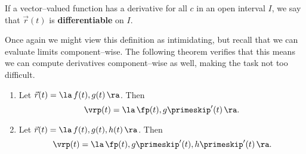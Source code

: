 
If a vector--valued function  has a derivative for all $c$ in an open interval $I$, we say that $\vec r(t)$ is \textbf{differentiable} on $I$.

Once again we might view this definition as intimidating, but recall that we can evaluate limits component--wise. The following theorem verifies that this means we can compute derivatives component--wise as well, making the task not too difficult.

{\begin{enumerate}
	\item Let $\vec r(t) = \la \, f(t), g(t)\,\ra$. Then 
	$$\vrp(t) = \la\, \fp(t), g\primeskip'(t)\, \ra.$$
	\item Let $\vec r(t) = \la \, f(t), g(t), h(t)\,\ra$. Then
	$$\vrp(t) = \la\, \fp(t), g\primeskip'(t), h\primeskip'(t)\, \ra.$$
\end{enumerate}
}\\


